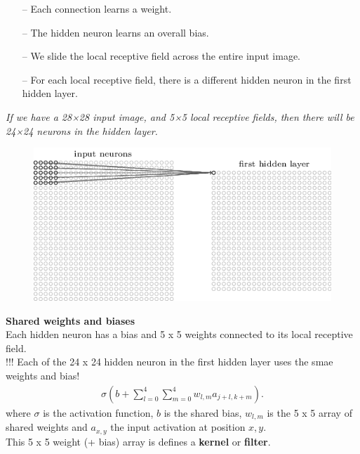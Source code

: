 \documentclass[10pt, compress]{beamer}
\begin{document}
\begin{frame}
  \begin{itemize}
    \item[--] Each connection learns a weight.
    \item[--] The hidden neuron learns an overall bias.
    \item[--] We slide the local receptive field across the entire input image.
    \item[--] For each local receptive field, there is a different hidden neuron in the first hidden layer.
  \end{itemize}
   \textit{If we have a 28×28 input image, and 5×5 local receptive fields, then there will be 24×24 neurons in the hidden layer.}

  \begin{figure}
    \includegraphics[width=.6\linewidth]{imgs/cnn/cnn_3}
  \end{figure}
\end{frame}

\begin{frame}
  \vspace{0.6cm}
  \textbf{Shared weights and biases} \\ \hfill \break
  Each hidden neuron has a bias and 5 x 5 weights connected to its local receptive field. \\
  !!! Each of the 24 x 24 hidden neuron in the first hidden layer uses the smae weights and bias!
  \begin{eqnarray}
  \sigma\left(b + \sum_{l=0}^4 \sum_{m=0}^4  w_{l,m} a_{j+l, k+m} \right).
  \nonumber
  \end{eqnarray}
  where $\sigma$ is the activation function, $b$ is the shared bias, $w_{l,m}$ is the 5 x 5 array of shared weights and $a_{x,y}$ the input activation at position $x,y$. \\
  This 5 x 5 weight (+ bias) array is defines a \textbf{kernel} or \textbf{filter}.
\end{frame}
\end{document}
